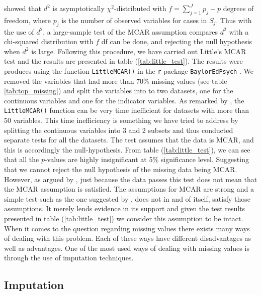 \documentclass[../thesis.tex]{subfiles}
\begin{document}
\noindent \cite{little1988test} showed that $d^2$ is asymptotically $\chi^2$-distributed with $f = \sum_{j=1}^J p_j - p$ degrees of freedom, where $p_j$ is the number of observed variables for cases in $S_j$. Thus with the use of $d^2$, a large-sample test of the MCAR assumption compares $d^2$ with a chi-squared distribution with $f$ df can be done, and rejecting the null hypothesis when $d^2$ is large. Following this procedure, we have carried out Little's MCAR test and the results are presented in table (\ref{tab:little_test}). The results were produces using the function \texttt{LittleMCAR()} in the \texttt{r} package \texttt{BaylorEdPsych} \citep{BaylorEdPsych}. We removed the variables that had more than 70\% missing values (see table \ref{tab:top_missing}) and split the variables into to two datasets, one for the continuous variables and one for the indicator variables. As remarked by \citep{BaylorEdPsych}, the \texttt{LittleMCAR()} function can be very time inefficient for datasets with more than 50 variables. This time inefficiency is something we have tried to address by splitting the continuous variables into 3 and 2 subsets and thus conducted separate tests for all the datasets. The test assumes that the data is MCAR, and this is accordingly the null-hypothesis. From table (\ref{tab:little_test}), we can see that all the $p$-values are highly insignificant at 5\% significance level. Suggesting that we cannot reject the null hypothesis of the missing data being MCAR. However, as argued by \cite{allison1999missing}, just because the data passes this test does not mean that the MCAR assumption is satisfied. The assumptions for MCAR are strong and a simple test such as the one suggested by \cite{little1988test}, does not in and of itself, satisfy those assumptions. It merely lends evidence in its support and given the test results presented in table (\ref{tab:little_test}) we consider this assumption to be intact.\\
\indent When it comes to the question regarding missing values there exists many ways of dealing with this problem. Each of these ways have different disadvantages as well as advantages. One of the most used ways of dealing with missing values is through the use of imputation techniques. 



\subsection{Imputation}
\label{subsec:impu}
\end{document}

